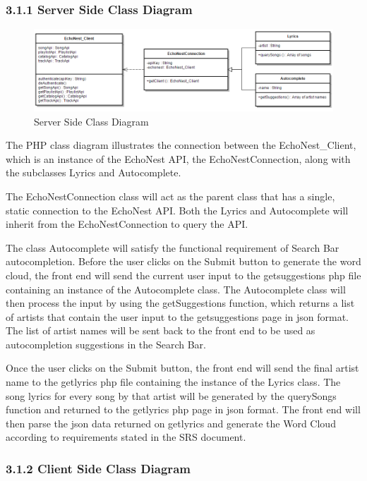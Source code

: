 \documentclass[]{article}
\begin{document}
\subsubsection{3.1.1 Server Side Class
Diagram}\label{server-side-class-diagram}

\begin{figure}[htbp]
\centering
\includegraphics{php_class_design.png}
\caption{Server Side Class Diagram}
\end{figure}

The PHP class diagram illustrates the connection between the
EchoNest\_Client, which is an instance of the EchoNest API, the
EchoNestConnection, along with the subclasses Lyrics and Autocomplete.

The EchoNestConnection class will act as the parent class that has a
single, static connection to the EchoNest API. Both the Lyrics and
Autocomplete will inherit from the EchoNestConnection to query the API.

The class Autocomplete will satisfy the functional requirement of Search
Bar autocompletion. Before the user clicks on the Submit button to
generate the word cloud, the front end will send the current user input
to the getsuggestions php file containing an instance of the
Autocomplete class. The Autocomplete class will then process the input
by using the getSuggestions function, which returns a list of artists
that contain the user input to the getsuggestions page in json format.
The list of artist names will be sent back to the front end to be used
as autocompletion suggestions in the Search Bar.

Once the user clicks on the Submit button, the front end will send the
final artist name to the getlyrics php file containing the instance of
the Lyrics class. The song lyrics for every song by that artist will be
generated by the querySongs function and returned to the getlyrics php
page in json format. The front end will then parse the json data
returned on getlyrics and generate the Word Cloud according to
requirements stated in the SRS document.

\subsubsection{3.1.2 Client Side Class
Diagram}\label{client-side-class-diagram}
\end{document}
